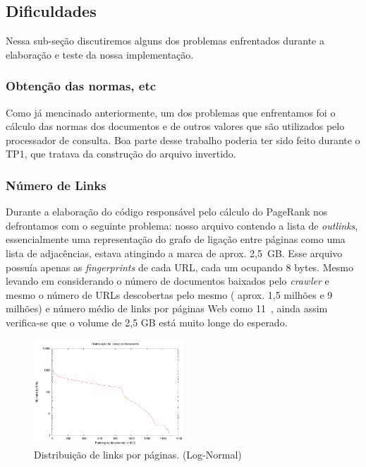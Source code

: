 \documentclass[10pt,twocolumn]{article}
\begin{document}
\subsection{Dificuldades}

Nessa sub-seção discutiremos alguns dos problemas enfrentados durante a
elaboração e teste da nossa implementação.

\subsubsection{Obtenção das normas, etc}

Como já mencinado anteriormente, um dos problemas que enfrentamos foi o
cálculo das normas dos documentos e de outros valores que são utilizados
pelo processador de consulta. Boa parte desse trabalho poderia ter sido
feito durante o TP1, que tratava da construção do arquivo invertido.

\subsubsection{Número de Links}

Durante a elaboração do código responsável pelo cálculo do PageRank nos
defrontamos com o seguinte problema: nosso arquivo contendo a lista de
\emph{outlinks}, essencialmente uma representação do grafo de ligação
entre páginas como uma lista de adjacências, estava atingindo a marca de
aprox. 2,5~GB. Esse arquivo possuía apenas as \emph{fingerprints} de
cada URL, cada um ocupando 8 bytes. Mesmo levando em considerando o
número de documentos baixados pelo \emph{crawler} e mesmo o número de
URLs descobertas pelo mesmo ( aprox. 1,5 milhões e 9 milhões) e número
médio de links por páginas Web como 11~\cite{page98pagerank}, ainda
assim verifica-se que o volume de 2,5 GB está muito longe do esperado.


\begin{figure}[ht]
\begin{center}
\includegraphics[width=0.5\textwidth]{plot_linkranking}
\end{center}
\caption{Distribuição de links por páginas. (Log-Normal)}
\label{fig:linkspp}
\end{figure}
\end{document}

